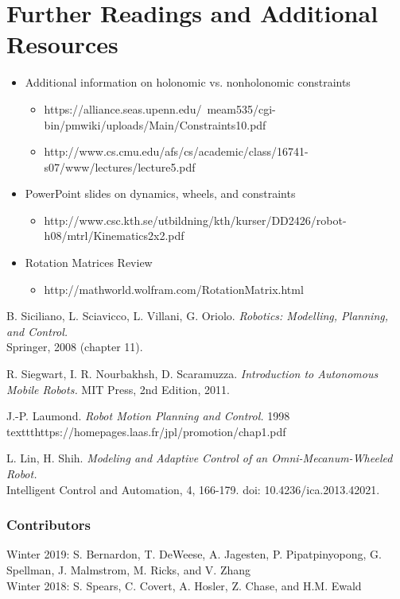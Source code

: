 \documentclass[twoside]{article}
\begin{document}
\section*{Further Readings and Additional Resources}

\begin{itemize}
   \item  Additional information on holonomic vs. nonholonomic constraints
   \begin{itemize}
     \item  https://alliance.seas.upenn.edu/~meam535/cgi-bin/pmwiki/uploads/Main/Constraints10.pdf
     \item http://www.cs.cmu.edu/afs/cs/academic/class/16741-s07/www/lectures/lecture5.pdf
   \end{itemize}
   \item PowerPoint slides on dynamics, wheels, and constraints
   \begin{itemize}
     \item  http://www.csc.kth.se/utbildning/kth/kurser/DD2426/robot-h08/mtrl/Kinematics2x2.pdf
   \end{itemize}
   \item Rotation Matrices Review
   \begin{itemize}
       \item http://mathworld.wolfram.com/RotationMatrix.html
   \end{itemize}
 \end{itemize}


\begin{thebibliography}{9}

B. Siciliano, L. Sciavicco, L. Villani, G. Oriolo.\textit{ Robotics: Modelling, Planning, and Control.} \\Springer, 2008 (chapter 11).

R. Siegwart, I. R. Nourbakhsh, D. Scaramuzza. \textit{Introduction to Autonomous Mobile Robots.} MIT Press, 2nd Edition, 2011.

J.-P. Laumond. \textit{Robot Motion Planning and Control.} 1998 \\texttt{https://homepages.laas.fr/jpl/promotion/chap1.pdf}

L. Lin, H. Shih. \textit{Modeling and Adaptive Control of an Omni-Mecanum-Wheeled Robot.} \\Intelligent Control and Automation, 4, 166-179. doi: 10.4236/ica.2013.42021.

\end{thebibliography}

\subsubsection*{Contributors}
Winter 2019: S. Bernardon, T. DeWeese,  A. Jagesten, P. Pipatpinyopong, G. Spellman, J. Malmstrom, M. Ricks, and V. Zhang
\\
Winter 2018: S. Spears, C. Covert, A. Hosler, Z. Chase, and H.M. Ewald
\end{document}
